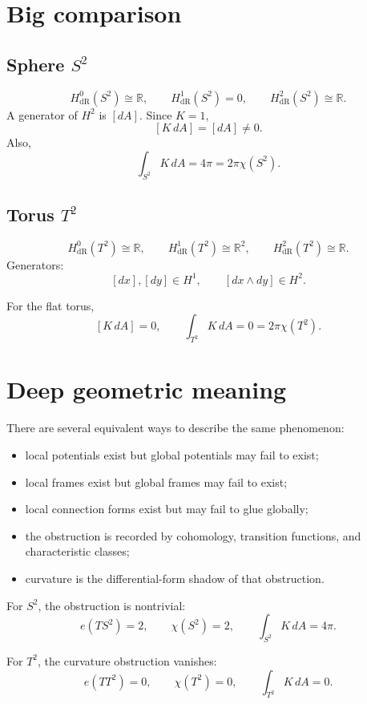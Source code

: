 \documentclass[11pt]{article}
\begin{document}
	\section{Big comparison}
	
	\subsection{Sphere \(S^2\)}
	
	\[
	H^0_{\mathrm{dR}}(S^2)\cong\mathbb{R},\qquad
	H^1_{\mathrm{dR}}(S^2)=0,\qquad
	H^2_{\mathrm{dR}}(S^2)\cong\mathbb{R}.
	\]
	A generator of \(H^2\) is \([dA]\). Since \(K=1\),
	\[
	[K\,dA]=[dA]\neq 0.
	\]
	Also,
	\[
	\int_{S^2}K\,dA=4\pi=2\pi\chi(S^2).
	\]
	
	\subsection{Torus \(T^2\)}
	
	\[
	H^0_{\mathrm{dR}}(T^2)\cong\mathbb{R},\qquad
	H^1_{\mathrm{dR}}(T^2)\cong\mathbb{R}^2,\qquad
	H^2_{\mathrm{dR}}(T^2)\cong\mathbb{R}.
	\]
	Generators:
	\[
	[dx],[dy]\in H^1,\qquad [dx\wedge dy]\in H^2.
	\]
	
	For the flat torus,
	\[
	[K\,dA]=0,
	\qquad
	\int_{T^2}K\,dA=0=2\pi\chi(T^2).
	\]
	
	\section{Deep geometric meaning}
	
	There are several equivalent ways to describe the same phenomenon:
	\begin{itemize}[leftmargin=2em]
		\item local potentials exist but global potentials may fail to exist;
		\item local frames exist but global frames may fail to exist;
		\item local connection forms exist but may fail to glue globally;
		\item the obstruction is recorded by cohomology, transition functions, and characteristic classes;
		\item curvature is the differential-form shadow of that obstruction.
	\end{itemize}
	
	For \(S^2\), the obstruction is nontrivial:
	\[
	e(TS^2)=2,\qquad \chi(S^2)=2,\qquad \int_{S^2}K\,dA=4\pi.
	\]
	
	For \(T^2\), the curvature obstruction vanishes:
	\[
	e(TT^2)=0,\qquad \chi(T^2)=0,\qquad \int_{T^2}K\,dA=0.
	\]
	
\end{document}
